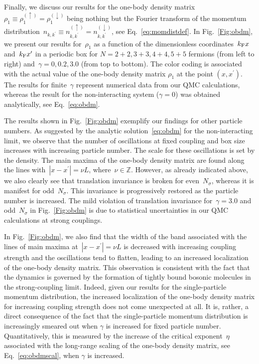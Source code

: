 \documentclass[pra,aps,groupedaddress,floatfix,twocolumn,superscriptaddress,showpacs,nofootinbib]{revtex4-1}
\newcommand{\kf}{k_\textnormal{F}}
\begin{document}
{Finally, we discuss our results for the one-body
density matrix $\rho_1\equiv \rho_1^{(\uparrow)}=\rho_1^{(\downarrow)}$ being nothing but the
Fourier transform of the
momentum distribution~$n_{k,k^{\prime}}\equiv n_{k,k^{\prime}}^{(\uparrow)} = n_{k,k^{\prime}}^{(\downarrow)}$,
see Eq.~\ref{eq:momdistdef}.
In Fig.~\ref{Fig:obdm}, we present our results for~$\rho_{1}$
as a function of the dimensionless coordinates~$\kf x$ and~$\kf x^{\prime}$ in a periodic box
for $N=2+2, 3+3, 4+4, 5+5$ fermions (from left to right) and~$\gamma=0, 0.2, 3.0$ (from top to bottom).
The color coding is associated with the actual value of the one-body
density matrix $\rho_1$ at the point $(x,x^{\prime})$.
The results for finite~$\gamma$ represent numerical
data from our QMC calculations, whereas the result for the non-interacting
system ($\gamma=0$) was obtained analytically, see Eq.~\eqref{eq:obdm}.

The results shown in Fig.~\ref{Fig:obdm} exemplify our findings for other particle numbers.
As suggested by the analytic solution~\eqref{eq:obdm} for the non-interacting limit,
we observe that the number of oscillations at fixed coupling and box size
increases with increasing particle number. The scale
for these oscillations is set by the density.
The main maxima of the one-body density matrix are found along the lines with~$|x-x^{\prime}|=\nu L$,
where~$\nu\in {\mathbb Z}$. However, as already indicated above, we also clearly see that
translation invariance is broken for even~$N_{\sigma}$, whereas it is manifest
for odd~$N_{\sigma}$. This invariance is progressively restored as the particle number is increased.
The mild violation of translation invariance for~$\gamma=3.0$ and odd~$N_{\sigma}$
in Fig.~\ref{Fig:obdm} is due to statistical uncertainties in our QMC calculations at strong couplings.

In Fig.~\ref{Fig:obdm}, we also find that the width of the band associated with the lines of
main maxima at~$|x-x^{\prime}|=\nu L$ is decreased with increasing coupling strength
and the oscillations tend to flatten, leading to an increased localization of the one-body density
matrix. This observation is consistent with the fact that the dynamics
is governed by the formation of tightly bound bosonic molecules in the strong-coupling limit.
Indeed, given our results for the single-particle momentum distribution,
the increased localization of {the one-body density matrix for} increasing coupling strength
does not come unexpected at all. It is, rather,
a direct consequence of the fact that the single-particle momentum distribution is
increasingly smeared out when $\gamma$ is increased for fixed particle number.
Quantitatively, this is measured by the increase of the
critical exponent~$\eta$ associated with the long-range scaling of the
one-body density matrix, see Eq.~\eqref{eq:obdmscal}, when $\gamma$ is increased.

}
\end{document}
